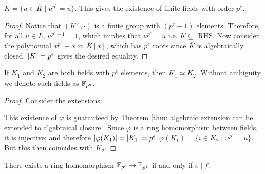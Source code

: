\begin{claim}\label{clm: fields with p^e elements}
    $K = \{u \in \overline{K} \mid u^{p^e} = u\}$. This gives the existence of finite fields with order $p^e$.
\end{claim}

\begin{proof}
    Notice that $(K^{\times}, \cdot)$ is a finite group with $(p^e - 1)$ elements. Therefore, for all $u \in L$, $u^{p^e - 1} = 1$, which implies that $u^{p^e} = u$ i.e. $K \subseteq $ RHS. Now consider the polynomial $x^{p^e} - x$ in $\overline{K}[x]$, which has $p^e$ roots since $\overline{K}$ is algebraically closed. $\left|K\right| = p^e$ gives the desired equality.
\end{proof}

\begin{proposition}\label{prop: F_pe are isomorphic}
    If $K_1$ and $K_2$ are both fields with $p^e$ elements, then $K_1 \simeq K_2$. Without ambiguity we denote such fields as $\mathbb{F}_{p^e}$.
\end{proposition}

\begin{proof}
    Consider the extensions:

    \begin{minipage}{\linewidth}
        \centering
    \end{minipage}

    This existence of $\varphi$ is guaranteed by Theorem \ref{thm: algebraic extension can be extended to algebraical closure}. Since $\varphi$ is a ring homomorphism between fields, it is injective; and therefore $\left|\varphi(K_1)\right| = \left|K_1\right| = p^e$ \implies $\varphi(K_1) = \{i \in \overline{K_2} \mid u^{p^e} = u\}$. But this then coincides with $K_2$.
\end{proof}

\begin{example}\label{ex: f_pe extends to f_pf iff e divides f}
    There exists a ring homomorphism $\mathbb{F}_{p^e} \to \mathbb{F}_{p^f}$ if and only if $e \mid f$. 
\end{example}
    
